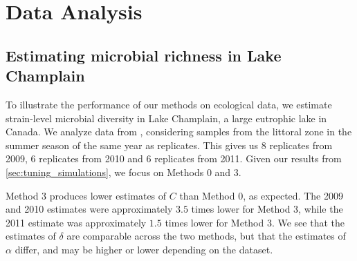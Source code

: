 \documentclass[12pt]{article}
\begin{document}
\section{Data Analysis}
\label{sec:data_analysis}

\subsection{Estimating microbial richness in Lake Champlain}

To illustrate the performance of our methods on ecological data, we estimate strain-level microbial diversity in Lake Champlain, a large eutrophic lake in Canada.  We analyze data from \citet{tromas_2017}, considering samples from the littoral zone in the summer season of the same year as replicates. This gives us 8 replicates from 2009, 6 replicates from 2010 and 6 replicates from 2011. Given our results from \ref{sec:tuning_simulations}, we focus on Methods 0 and 3.

Method 3 produces lower estimates of $C$ than Method 0, as expected.
The 2009 and 2010 estimates were approximately $3.5$ times lower for Method 3, while the 2011 estimate was approximately $1.5$ times lower for Method 3. We see that the estimates of $\delta$ are comparable across the two methods, but that the estimates of $\alpha$ differ, and may be higher or lower depending on the dataset.

%
\end{document}
